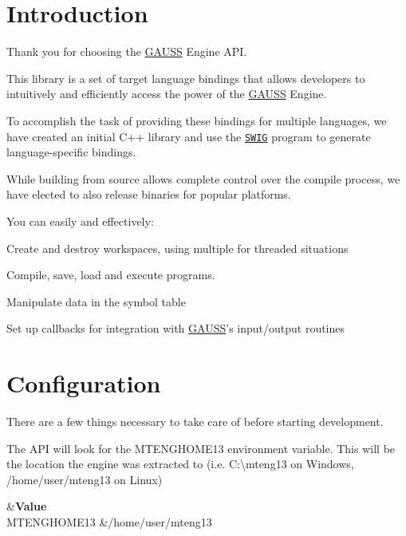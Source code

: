 \hypertarget{index_intro_sec}{}\section{Introduction}\label{index_intro_sec}
Thank you for choosing the \hyperlink{class_g_a_u_s_s}{G\-A\-U\-S\-S} Engine A\-P\-I.

This library is a set of target language bindings that allows developers to intuitively and efficiently access the power of the \hyperlink{class_g_a_u_s_s}{G\-A\-U\-S\-S} Engine.

To accomplish the task of providing these bindings for multiple languages, we have created an initial C++ library and use the \href{http://www.swig.org}{\tt S\-W\-I\-G} program to generate language-\/specific bindings.

While building from source allows complete control over the compile process, we have elected to also release binaries for popular platforms.

You can easily and effectively\-:
\begin{DoxyItemize}
\item Create and destroy workspaces, using multiple for threaded situations
\item Compile, save, load and execute programs.
\item Manipulate data in the symbol table
\item Set up callbacks for integration with \hyperlink{class_g_a_u_s_s}{G\-A\-U\-S\-S}'s input/output routines
\end{DoxyItemize}\hypertarget{index_getting_started_sec}{}\section{Configuration}\label{index_getting_started_sec}
There are a few things necessary to take care of before starting development.

The A\-P\-I will look for the {\ttfamily M\-T\-E\-N\-G\-H\-O\-M\-E13} environment variable. This will be the location the engine was extracted to (i.\-e. {\ttfamily C\-:\textbackslash{}mteng13} on Windows, {\ttfamily /home/user/mteng13} on Linux)

\begin{TabularC}{2}
\hline
{}&{\bf Value}\\
{\ttfamily M\-T\-E\-N\-G\-H\-O\-M\-E13} &{\ttfamily /home/user/mteng13} \\
\end{TabularC}


